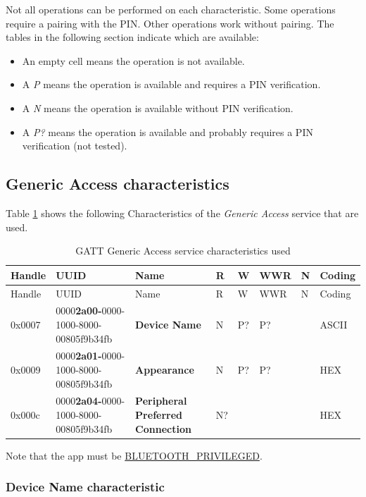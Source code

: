 \documentclass[a4paper]{article}
\begin{document}
Not all operations can be performed on each characteristic. 
Some operations require a pairing with the PIN.
Other operations work without pairing.
The tables in the following section indicate which are available:
\begin{itemize}
	\item An empty cell means the operation is not available.
	\item A \emph{P} means the operation is available and requires a PIN verification.
	\item A \emph{N} means the operation is available without PIN verification.
	\item A \emph{P?} means the operation is available and probably requires a PIN verification (not tested).
\end{itemize}

\subsection{Generic Access characteristics}
\label{generic_access_characteristics}

Table \ref{table.6} shows the following Characteristics of the \emph{Generic Access} service that are used.

\begin{longtable}[]{p{1cm} p{5.7cm} p{3.7cm} p{0.4cm} p{0.5cm} p{0.9cm} p{0.4cm}  p{0.9cm}}
	\caption{GATT Generic Access service characteristics used}
	\label{table.6}
	\tabularnewline
	\toprule\noalign{}
	Handle & UUID & Name & R & W & WWR & N & Coding \\
	\midrule\noalign{}
	\endfirsthead
	\toprule\noalign{}
	Handle & UUID & Name & R & W & WWR & N & Coding \\
	\midrule\noalign{}
	\endhead
	\bottomrule\noalign{}
	\endlastfoot
	0x0007 & \small 0000\textbf{2a00-}0000-1000-8000-00805f9b34fb & \textbf{Device
	Name} & N & P? & P? & & ASCII \\
	0x0009 & \small 0000\textbf{2a01-}0000-1000-8000-00805f9b34fb &
	\textbf{Appearance} & N & P? & P? & & HEX \\
	0x000c & \small 0000\textbf{2a04-}0000-1000-8000-00805f9b34fb &
	\textbf{Peripheral Preferred Connection} & N? & & & & HEX \\
\end{longtable}

Note that the app must be \href{https://developer.android.com/reference/android/Manifest.permission.html#BLUETOOTH_PRIVILEGED}{ BLUETOOTH\_PRIVILEGED}.

\subsubsection{Device Name characteristic}
\label{device_name_characteristic}
\end{document}
